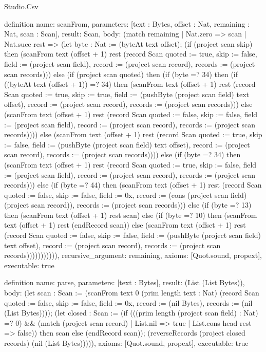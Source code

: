 \begin{lexlean}{Studio.Csv}
\begin{semanticmodule}
definition{
  name: scanFrom,
  parameters: [text : Bytes, offset : Nat, remaining : Nat, scan : Scan],
  result: Scan,
  body: (match remaining
    | Nat.zero => scan
    | Nat.succ rest => (let byte : Nat := (byteAt text offset); (if (project scan skip) then (scanFrom text (offset + 1) rest (record Scan {quoted := true, skip := false, field := (project scan field), record := (project scan record), records := (project scan records)})) else (if (project scan quoted) then (if (byte =? 34) then (if ((byteAt text (offset + 1)) =? 34) then (scanFrom text (offset + 1) rest (record Scan {quoted := true, skip := true, field := (pushByte (project scan field) text offset), record := (project scan record), records := (project scan records)})) else (scanFrom text (offset + 1) rest (record Scan {quoted := false, skip := false, field := (project scan field), record := (project scan record), records := (project scan records)}))) else (scanFrom text (offset + 1) rest (record Scan {quoted := true, skip := false, field := (pushByte (project scan field) text offset), record := (project scan record), records := (project scan records)}))) else (if (byte =? 34) then (scanFrom text (offset + 1) rest (record Scan {quoted := true, skip := false, field := (project scan field), record := (project scan record), records := (project scan records)})) else (if (byte =? 44) then (scanFrom text (offset + 1) rest (record Scan {quoted := false, skip := false, field := 0x, record := (cons (project scan field) (project scan record)), records := (project scan records)})) else (if (byte =? 13) then (scanFrom text (offset + 1) rest scan) else (if (byte =? 10) then (scanFrom text (offset + 1) rest (endRecord scan)) else (scanFrom text (offset + 1) rest (record Scan {quoted := false, skip := false, field := (pushByte (project scan field) text offset), record := (project scan record), records := (project scan records)})))))))))),
  recursive_argument: remaining,
  axioms: [Quot.sound, propext],
  executable: true
}

definition{
  name: parse,
  parameters: [text : Bytes],
  result: (List (List Bytes)),
  body: (let scan : Scan := (scanFrom text 0 (prim length text : Nat) (record Scan {quoted := false, skip := false, field := 0x, record := (nil Bytes), records := (nil (List Bytes))})); (let closed : Scan := (if (((prim length (project scan field) : Nat) =? 0) && (match (project scan record)
      | List.nil => true
      | List.cons head rest => false)) then scan else (endRecord scan)); (reverseRecords (project closed records) (nil (List Bytes))))),
  axioms: [Quot.sound, propext],
  executable: true
}
\end{semanticmodule}
\end{lexlean}
